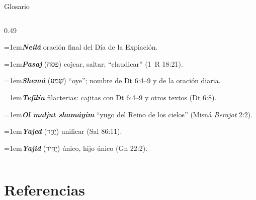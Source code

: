 \documentclass[hyperref={bookmarks=false},aspectratio=169]{beamer}
\newcommand{\heb}[1]{\mbox{\foreignlanguage{hebrew}{#1}}}
\begin{document}
\begin{frame}{Glosario}
\begin{columns}[t,onlytextwidth]
\begin{column}{0.49\textwidth}
\par\noindent\hangindent=1em{\color{azul}\textbf{\emph{Neilá}}} oración final del Día de la Expiación.\par\vspace{2pt}
\par\noindent\hangindent=1em{\color{azul}\textbf{\emph{Pasaj}}} (\heb{פסח}) cojear, saltar; ``claudicar'' (1~R 18:21).\par\vspace{2pt}
\par\noindent\hangindent=1em{\color{azul}\textbf{\emph{Shemá}}} (\heb{שְׁמַע}) ``oye''; nombre de Dt 6:4--9 y de la oración diaria.\par\vspace{2pt}
\par\noindent\hangindent=1em{\color{azul}\textbf{\emph{Tefilín}}} filacterias: cajitas con Dt 6:4--9 y otros textos (Dt 6:8).\par\vspace{2pt}
\par\noindent\hangindent=1em{\color{azul}\textbf{\emph{Ol maljut shamáyim}}} ``yugo del Reino de los cielos'' (Misná \emph{Berajot} 2:2).\par\vspace{2pt}
\par\noindent\hangindent=1em{\color{azul}\textbf{\emph{Yajed}}} (\heb{יַחֵד}) unificar (Sal 86:11).\par\vspace{2pt}
\par\noindent\hangindent=1em{\color{azul}\textbf{\emph{Yajid}}} (\heb{יָחִיד}) único, hijo único (Gn 22:2).\par\vspace{2pt}

\end{column}
\end{columns}
\end{frame}

\section{Referencias}
\end{document}
